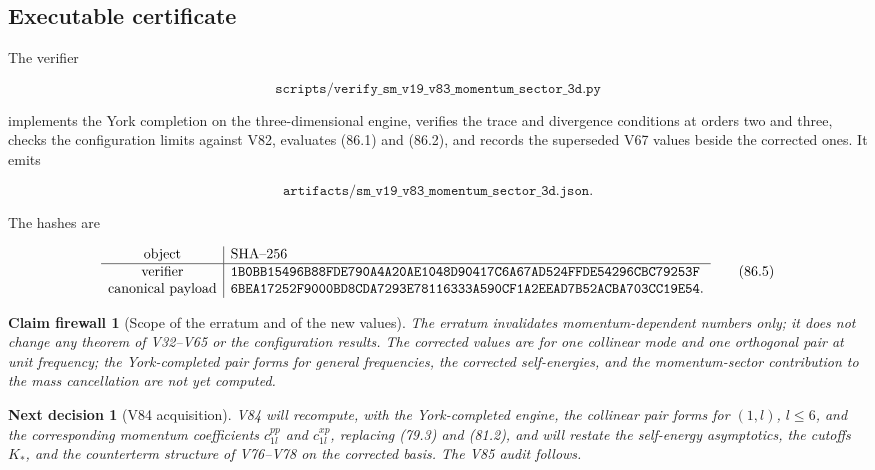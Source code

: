 \documentclass[11pt]{article}
\newtheorem{firewall}[theorem]{Claim firewall}
\newtheorem{decision}[theorem]{Next decision}
\theoremstyle{remark}
\begin{document}
\subsection{Executable certificate}

The verifier

\[
 \texttt{scripts/verify\_sm\_v19\_v83\_momentum\_sector\_3d.py}      \tag{86.3}
\]

implements the York completion on the three-dimensional engine,
verifies the trace and divergence conditions at orders two and three,
checks the configuration limits against V82, evaluates (86.1) and
(86.2), and records the superseded V67 values beside the corrected
ones.  It emits

\[
 \texttt{artifacts/sm\_v19\_v83\_momentum\_sector\_3d.json}.         \tag{86.4}
\]

The hashes are

\[
\begin{array}{c|l}
\hbox{object}&\hbox{SHA--256}\\ \hline
\hbox{verifier}&
\texttt{1B0BB15496B88FDE790A4A20AE1048D90417C6A67AD524FFDE54296CBC79253F}\\
\hbox{canonical payload}&
\texttt{6BEA17252F9000BD8CDA7293E78116333A590CF1A2EEAD7B52ACBA703CC19E54}.
\end{array}                                                     \tag{86.5}
\]

\begin{firewall}[Scope of the erratum and of the new values]
\label{fire:v19v83}
The erratum invalidates momentum-dependent numbers only; it does not
change any theorem of V32--V65 or the configuration results.  The
corrected values are for one collinear mode and one orthogonal pair at
unit frequency; the York-completed pair forms for general
frequencies, the corrected self-energies, and the momentum-sector
contribution to the mass cancellation are not yet computed.
\end{firewall}

\begin{decision}[V84 acquisition]
\label{dec:v19v83-next}
V84 will recompute, with the York-completed engine, the collinear pair
forms for \((1,l)\), \(l\leq6\), and the corresponding momentum
coefficients \(c^{pp}_{1l}\) and \(c^{xp}_{1l}\), replacing (79.3) and
(81.2), and will restate the self-energy asymptotics, the cutoffs
\(K_*\), and the counterterm structure of V76--V78 on the corrected
basis.  The V85 audit follows.
\end{decision}
\end{document}
